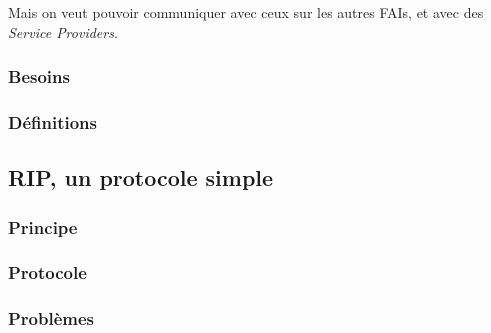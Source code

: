 \documentclass{article}
\begin{document}
Mais on veut pouvoir communiquer avec ceux sur les autres FAIs, et avec des \emph{Service Providers}.

\subsubsection{Besoins}

\subsubsection{Définitions}

\subsection{RIP, un protocole simple}

\subsubsection{Principe}

\subsubsection{Protocole}

\subsubsection{Problèmes}
\end{document}
